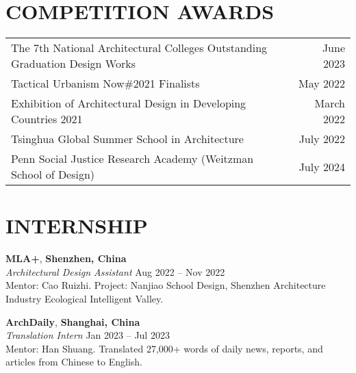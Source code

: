 \documentclass[10pt, letterpaper]{article}
\begin{document}
    \section*{COMPETITION AWARDS}
    \vspace{0.2em}
    \begin{tabularx}{\textwidth}{@{}Xr@{}}
    {The 7th National Architectural Colleges Outstanding Graduation Design Works} & {June 2023} \\
    {Tactical Urbanism Now\#2021 Finalists} & {May 2022} \\
    {Exhibition of Architectural Design in Developing Countries 2021} & {March 2022} \\
    {Tsinghua Global Summer School in Architecture} & {July 2022} \\
    {Penn Social Justice Research Academy (Weitzman School of Design)} & {July 2024} \\
    \end{tabularx}

    \section*{INTERNSHIP}
    
    \textbf{MLA+}, \textbf{Shenzhen, China} \\
    \textit{Architectural Design Assistant} \hfill {Aug 2022 – Nov 2022} \\
    Mentor: Cao Ruizhi. Project: Nanjiao School Design, Shenzhen Architecture Industry Ecological Intelligent Valley.
    
    \vspace{0.2cm}
    
    \textbf{ArchDaily}, \textbf{Shanghai, China} \\
    \textit{Translation Intern} \hfill {Jan 2023 – Jul 2023} \\
    Mentor: Han Shuang. Translated 27,000+ words of daily news, reports, and articles from Chinese to English.
    
    \vspace{0.2cm}


    


    
\end{document}
